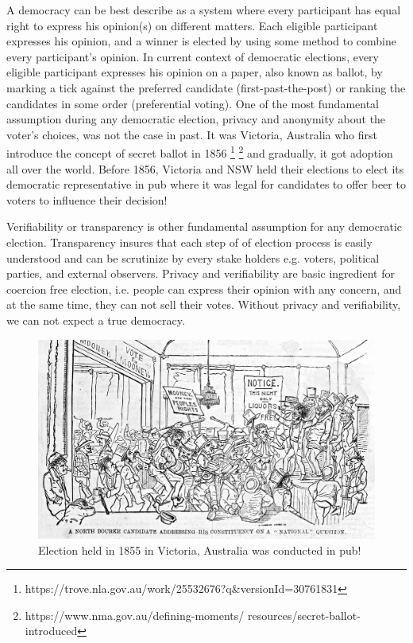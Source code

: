   







A democracy can be best describe as a system where every participant 
has equal right to express his opinion(s) on different matters. Each
eligible participant expresses his opinion, and a winner is elected 
by using some method to combine every participant's opinion.
In current context of democratic elections, 
every eligible participant expresses his opinion on a paper, also 
known as ballot, 
by marking a tick against the preferred candidate 
(first-past-the-post) or ranking the candidates in some order
(preferential voting). 
One of the most fundamental assumption during any democratic 
election, privacy and anonymity about the voter's choices, was not the case 
in past. It was Victoria, Australia who first introduce the 
concept of secret ballot in 1856 \footnote{
 https://trove.nla.gov.au/work/25532676?q\&versionId=30761831}
 \footnote{https://www.nma.gov.au/defining-moments/
	  resources/secret-ballot-introduced} and gradually, it 
	  got adoption all over the world. Before 1856, Victoria
	  and NSW held their elections to elect its 
	  democratic representative in pub where it was legal for 
	  candidates to offer beer to voters to influence their 
	  decision! 
	  
Verifiability or transparency is other fundamental assumption for 
any democratic election. Transparency insures that each step of 
of election process is easily understood and can be scrutinize by 
every stake holders e.g. voters, political parties, and external 
observers. Privacy and verifiability  are basic 
ingredient for coercion free election, i.e. people 
can express their opinion with any concern, and at the same time,
they can not sell their votes. Without privacy and verifiability, 
we can not expect a true democracy.   

 
 \begin{figure}[htb]
	\begin{center}
	\includegraphics[scale=0.25]{NorthBourke.jpg}
	\caption{Election held in 1855 in Victoria, Australia 
	  was conducted in pub!}
	\end{center}
  \end{figure}   
  

